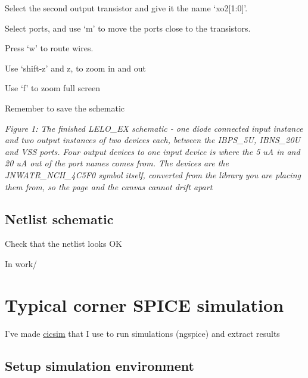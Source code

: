 Select the second output transistor and give it the name `xo2{[}1:0{]}'.

Select ports, and use `m' to move the ports close to the transistors.

Press `w' to route wires.

Use `shift-z' and z, to zoom in and out

Use `f' to zoom full screen

Remember to save the schematic


{
\centering
{}
}

\emph{Figure 1: The finished LELO\_EX schematic - one diode connected
input instance and two output instances of two devices each, between the
IBPS\_5U, IBNS\_20U and VSS ports. Four output devices to one input
device is where the 5 uA in and 20 uA out of the port names comes from.
The devices are the JNWATR\_NCH\_4C5F0 symbol itself, converted from the
library you are placing them from, so the page and the canvas cannot
drift apart}

\subsection{Netlist schematic}\label{netlist-schematic}

Check that the netlist looks OK

In work/

\begin{Shaded}
\begin{Highlighting}[]
\end{Highlighting}
\end{Shaded}

\section{\texorpdfstring{Typical corner SPICE simulation
}{Typical corner SPICE simulation }}\label{typical-corner-spice-simulation}

I've made \href{https://github.com/wulffern/cicsim}{cicsim} that I use
to run simulations (ngspice) and extract results

\subsection{Setup simulation
environment}\label{setup-simulation-environment}

